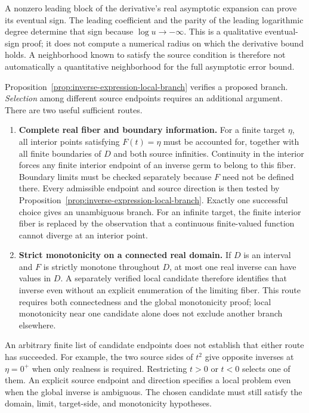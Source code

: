 A nonzero leading block of the derivative's real asymptotic expansion
can prove its eventual sign. The leading coefficient and the parity of
the leading logarithmic degree determine that sign because
$\log u\to-\infty$. This is a qualitative eventual-sign proof; it does
not compute a numerical radius on which the derivative bound holds.
A neighborhood known to satisfy the source condition is therefore not
automatically a quantitative neighborhood for the full asymptotic error bound.

Proposition~\ref{prop:inverse-expression-local-branch} verifies a proposed
branch. \emph{Selection} among different source endpoints
requires an additional argument. There are two useful sufficient routes.

\begin{enumerate}[leftmargin=*]
\item \textbf{Complete real fiber and boundary information.}
For a finite target $\eta$, all interior points satisfying $F(t)=\eta$
must be accounted for, together with all finite boundaries of $D$ and
both source infinities. Continuity in the interior forces any finite
interior endpoint of an inverse germ to belong to this fiber. Boundary
limits must be checked separately because $F$ need not be defined there.
Every admissible endpoint and source direction is then tested by
Proposition~\ref{prop:inverse-expression-local-branch}. Exactly one
successful choice gives an unambiguous branch. For an infinite target,
the finite interior fiber is replaced by the observation that a
continuous finite-valued function cannot diverge at an interior point.
\item \textbf{Strict monotonicity on a connected real domain.}
If $D$ is an interval and $F$ is strictly monotone throughout $D$, at
most one real inverse can have values in $D$. A separately verified
local candidate therefore identifies that inverse even without an explicit enumeration of the limiting fiber. This route requires both connectedness
and the global monotonicity proof; local monotonicity near one candidate
alone does not exclude another branch elsewhere.
\end{enumerate}

An arbitrary finite list of candidate endpoints does not establish that
either route has succeeded. For example, the two source sides of $t^2$ give
opposite inverses at $\eta=0^+$ when only realness is required. Restricting
$t>0$ or $t<0$ selects one of them. An explicit source endpoint and
direction specifies a local problem even when the global inverse is ambiguous.
The chosen candidate must still satisfy the domain, limit, target-side,
and monotonicity hypotheses.

